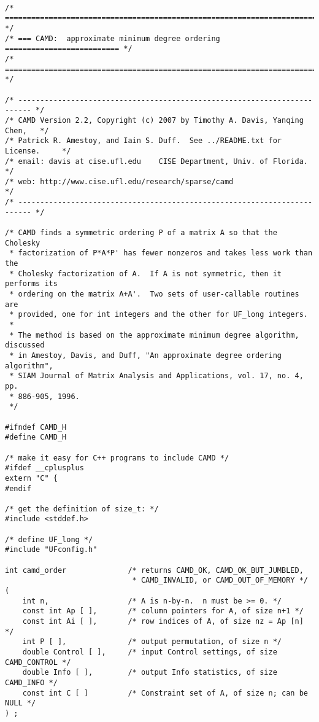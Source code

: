 \documentclass[11pt]{article}
\begin{document}
{\footnotesize
\begin{verbatim}

/* ========================================================================= */
/* === CAMD:  approximate minimum degree ordering ========================== */
/* ========================================================================= */

/* ------------------------------------------------------------------------- */
/* CAMD Version 2.2, Copyright (c) 2007 by Timothy A. Davis, Yanqing Chen,   */
/* Patrick R. Amestoy, and Iain S. Duff.  See ../README.txt for License.     */
/* email: davis at cise.ufl.edu    CISE Department, Univ. of Florida.        */
/* web: http://www.cise.ufl.edu/research/sparse/camd                         */
/* ------------------------------------------------------------------------- */

/* CAMD finds a symmetric ordering P of a matrix A so that the Cholesky
 * factorization of P*A*P' has fewer nonzeros and takes less work than the
 * Cholesky factorization of A.  If A is not symmetric, then it performs its
 * ordering on the matrix A+A'.  Two sets of user-callable routines are
 * provided, one for int integers and the other for UF_long integers.
 *
 * The method is based on the approximate minimum degree algorithm, discussed
 * in Amestoy, Davis, and Duff, "An approximate degree ordering algorithm",
 * SIAM Journal of Matrix Analysis and Applications, vol. 17, no. 4, pp.
 * 886-905, 1996.
 */

#ifndef CAMD_H
#define CAMD_H

/* make it easy for C++ programs to include CAMD */
#ifdef __cplusplus
extern "C" {
#endif

/* get the definition of size_t: */
#include <stddef.h>

/* define UF_long */
#include "UFconfig.h"

int camd_order              /* returns CAMD_OK, CAMD_OK_BUT_JUMBLED,
                             * CAMD_INVALID, or CAMD_OUT_OF_MEMORY */
(
    int n,                  /* A is n-by-n.  n must be >= 0. */
    const int Ap [ ],       /* column pointers for A, of size n+1 */
    const int Ai [ ],       /* row indices of A, of size nz = Ap [n] */
    int P [ ],              /* output permutation, of size n */
    double Control [ ],     /* input Control settings, of size CAMD_CONTROL */
    double Info [ ],        /* output Info statistics, of size CAMD_INFO */
    const int C [ ]         /* Constraint set of A, of size n; can be NULL */
) ;


\end{verbatim}}
\end{document}

